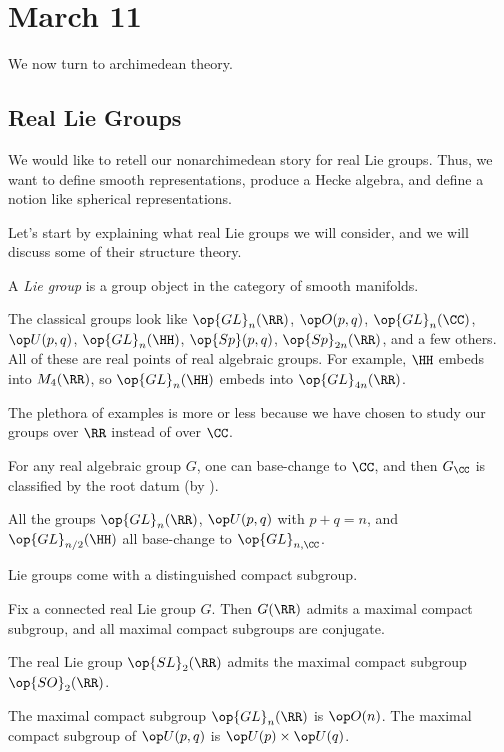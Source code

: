 \documentclass[../notes.tex]{subfiles}
\begin{document}
\section{March 11}
We now turn to archimedean theory.

\subsection{Real Lie Groups}
We would like to retell our nonarchimedean story for real Lie groups. Thus, we want to define smooth representations, produce a Hecke algebra, and define a notion like spherical representations.

Let's start by explaining what real Lie groups we will consider, and we will discuss some of their structure theory.
\begin{definition}
	A \textit{Lie group} is a group object in the category of smooth manifolds.
\end{definition}
\begin{example}
	The classical groups look like $\op{GL}_n(\RR)$, $\op O(p,q)$, $\op{GL}_n(\CC)$, $\op U(p,q)$, $\op{GL}_n(\HH)$, $\op{Sp}(p,q)$, $\op{Sp}_{2n}(\RR)$, and a few others. All of these are real points of real algebraic groups. For example, $\HH$ embeds into $M_4(\RR)$, so $\op{GL}_n(\HH)$ embeds into $\op{GL}_{4n}(\RR)$.
\end{example}
The plethora of examples is more or less because we have chosen to study our groups over $\RR$ instead of over $\CC$.
\begin{remark}
	For any real algebraic group $G$, one can base-change to $\CC$, and then $G_\CC$ is classified by the root datum (by ).
\end{remark}
\begin{example}
	All the groups $\op{GL}_n(\RR)$, $\op U(p,q)$ with $p+q=n$, and $\op{GL}_{n/2}(\HH)$ all base-change to $\op{GL}_{n,\CC}$.
\end{example}
Lie groups come with a distinguished compact subgroup.
\begin{theorem}[Cartan]
	Fix a connected real Lie group $G$. Then $G(\RR)$ admits a maximal compact subgroup, and all maximal compact subgroups are conjugate.
\end{theorem}
\begin{example}
	The real Lie group $\op{SL}_2(\RR)$ admits the maximal compact subgroup $\op{SO}_2(\RR)$.
\end{example}
\begin{example}
	The maximal compact subgroup $\op{GL}_n(\RR)$ is $\op O(n)$. The maximal compact subgroup of $\op U(p,q)$ is $\op U(p)\times\op U(q)$.
\end{example}
\end{document}
